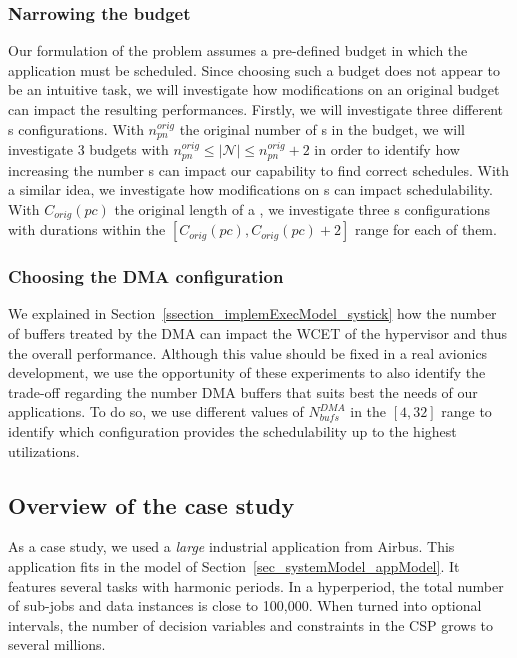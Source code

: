 \documentclass[main.tex]{subfiles}
\begin{document}
\subsubsection{Narrowing the budget}
\label{sssec_validation_expGoalNarrowBudget}
Our formulation of the problem assumes a pre-defined budget in which the application must be scheduled. Since choosing such a budget does not appear to be an intuitive task, we will investigate how modifications on an original budget can impact the resulting performances. Firstly, we will investigate three different \PN{}s configurations. With $n_{pn}^{orig}$ the original number of \PN{}s in the budget, we will investigate 3 budgets with $ n_{pn}^{orig} \leq |\mathcal{N}| \leq n_{pn}^{orig} + 2$ in order to identify how increasing the number \PN{}s can impact our capability to find correct schedules. With a similar idea, we investigate how modifications on \PC{}s can impact schedulability. With $C_{orig}(pc)$ the original length of a \PC{}, we investigate three \PC{}s configurations with durations within the $[ C_{orig}(pc) , C_{orig}(pc) +2 ]$ range for each of them.

\subsubsection{Choosing the DMA configuration}
We explained in Section~\ref{ssection_implemExecModel_systick} how the number of buffers treated by the DMA can impact the WCET of the hypervisor and thus the overall performance. Although this value should be fixed in a real avionics development, we use the opportunity of these experiments to also identify the trade-off regarding the number DMA buffers that suits best the needs of our applications. To do so, we use different values of $N_{bufs}^{DMA}$ in the $[4,32]$ range to identify which configuration provides the schedulability up to the highest utilizations.

\subsection{Overview of the case study}
As a case study, we used a \emph{large} industrial application from Airbus. This application fits in the model of Section~\ref{sec_systemModel_appModel}. It features several tasks with harmonic periods. In a hyperperiod, the total number of sub-jobs and data instances is close to 100,000. When turned into optional intervals, the number of decision variables and constraints in the CSP grows to several millions. 
\end{document}
